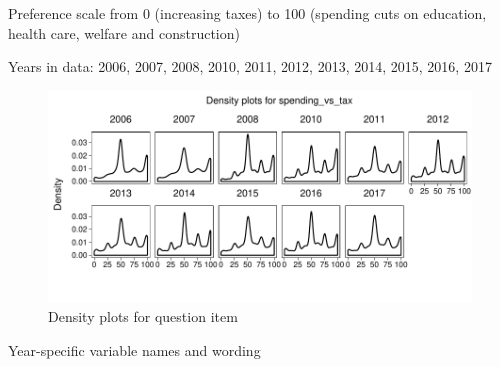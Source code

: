\documentclass[12pt]{article}
\begin{document}
Preference scale from 0 (increasing taxes) to 100 (spending cuts on
education, health care, welfare and construction)

Years in data: 2006, 2007, 2008, 2010, 2011, 2012, 2013, 2014, 2015,
2016, 2017

\begin{figure}

{\centering \includegraphics{guide_cumulative_cces_policy_preferences_files/figure-latex/unnamed-chunk-4-1} 

}

\caption{Density plots for question item}\label{fig:unnamed-chunk-4-1}
\end{figure}

Year-specific variable names and wording
\end{document}
